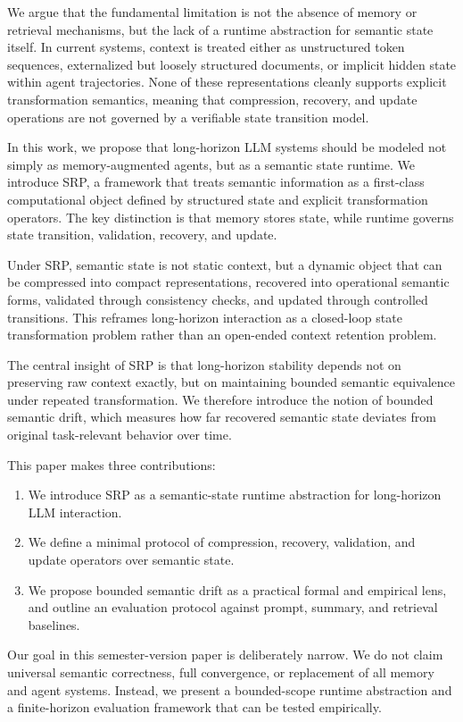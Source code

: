 \documentclass[11pt]{article}
\begin{document}
We argue that the fundamental limitation is not the absence of memory or retrieval mechanisms, but the lack of a runtime abstraction for semantic state itself. In current systems, context is treated either as unstructured token sequences, externalized but loosely structured documents, or implicit hidden state within agent trajectories. None of these representations cleanly supports explicit transformation semantics, meaning that compression, recovery, and update operations are not governed by a verifiable state transition model.

In this work, we propose that long-horizon LLM systems should be modeled not simply as memory-augmented agents, but as a semantic state runtime. We introduce SRP, a framework that treats semantic information as a first-class computational object defined by structured state and explicit transformation operators. The key distinction is that memory stores state, while runtime governs state transition, validation, recovery, and update.

Under SRP, semantic state is not static context, but a dynamic object that can be compressed into compact representations, recovered into operational semantic forms, validated through consistency checks, and updated through controlled transitions. This reframes long-horizon interaction as a closed-loop state transformation problem rather than an open-ended context retention problem.

The central insight of SRP is that long-horizon stability depends not on preserving raw context exactly, but on maintaining bounded semantic equivalence under repeated transformation. We therefore introduce the notion of bounded semantic drift, which measures how far recovered semantic state deviates from original task-relevant behavior over time.

This paper makes three contributions:
\begin{enumerate}[leftmargin=*]
  \item We introduce SRP as a semantic-state runtime abstraction for long-horizon LLM interaction.
  \item We define a minimal protocol of compression, recovery, validation, and update operators over semantic state.
  \item We propose bounded semantic drift as a practical formal and empirical lens, and outline an evaluation protocol against prompt, summary, and retrieval baselines.
\end{enumerate}

Our goal in this semester-version paper is deliberately narrow. We do not claim universal semantic correctness, full convergence, or replacement of all memory and agent systems. Instead, we present a bounded-scope runtime abstraction and a finite-horizon evaluation framework that can be tested empirically.
\end{document}
